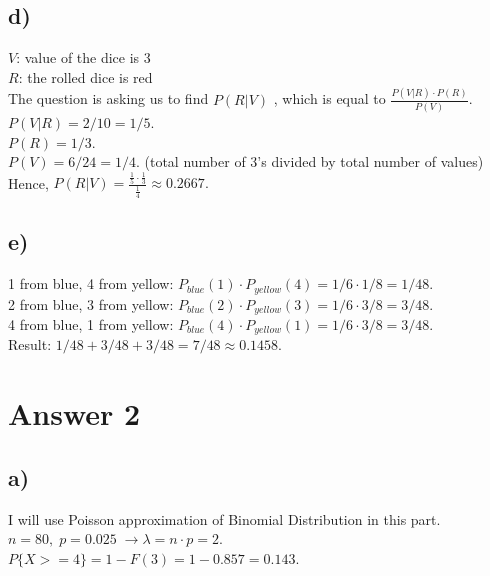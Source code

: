 \documentclass[12pt]{article}
\begin{document}
\subsection*{d)}
$V$: value of the dice is 3\\
$R$: the rolled dice is red\\
The question is asking us to find $P(R|V)$ , which is equal to $\frac{P(V|R)\cdot P(R)}{P(V)}$.\\
$P(V|R) = 2/10 = 1/5.$\\
$P(R) = 1/3.$\\
$P(V) = 6/24 = 1/4.$\; (total number of 3's divided by total number of values)\\
Hence, \;$ P(R|V) = \frac{\frac{1}{5}\cdot \frac{1}{3}}{\frac{1}{4}} \approx 0.2667. $
\subsection*{e)}
1 from blue, 4 from yellow: $P_{blue}(1) \cdot P_{yellow}(4) = 1/6 \cdot 1/8 = 1/48.$\vspace{0.1cm}\\
2 from blue, 3 from yellow: $P_{blue}(2) \cdot P_{yellow}(3) = 1/6 \cdot 3/8 = 3/48.$\vspace{0.1cm}\\
4 from blue, 1 from yellow: $P_{blue}(4) \cdot P_{yellow}(1) = 1/6 \cdot 3/8 = 3/48.$\vspace{0.1cm}\\
Result: $1/48 + 3/48 + 3/48 = 7/48 \approx 0.1458.$
\section*{Answer 2}
\subsection*{a)}
I will use Poisson approximation of Binomial Distribution in this part.\\
$n=80, \; p=0.025 \; \rightarrow \lambda = n \cdot p = 2.$\\
$P\{X>=4\} = 1 - F(3) = 1 - 0.857 = 0.143.$
\end{document}
